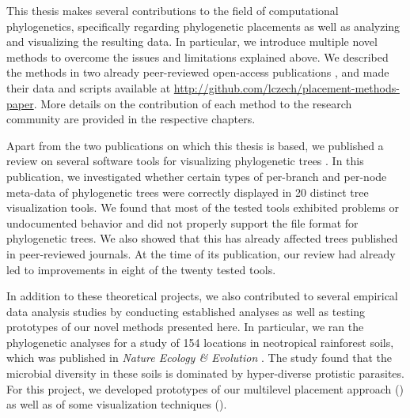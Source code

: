 This thesis makes several contributions to the field of computational phylogenetics,
specifically regarding phylogenetic placements as well as analyzing and visualizing the resulting data.
In particular, we introduce multiple novel methods to overcome the issues and limitations explained above.
We described the methods in two already peer-reviewed open-access publications \cite{Czech2018-phat,Czech2019-analysis},
and made their data and scripts available at \url{http://github.com/lczech/placement-methods-paper}.
More details on the contribution of each method to the research community are provided in the respective chapters.

Apart from the two publications on which this thesis is based,
we published a review on several software tools for visualizing phylogenetic trees \cite{Czech2017-tree-viewers}.
In this publication, we investigated whether certain types of per-branch and per-node meta-data of phylogenetic trees
were correctly displayed in \num{20} distinct tree visualization tools.
We found that most of the tested tools exhibited problems or undocumented behavior and
did not properly support the  file format for phylogenetic trees.
We also showed that this has already affected trees published in peer-reviewed journals.
At the time of its publication, our review had already led to improvements in eight of the twenty tested tools.

In addition to these theoretical projects, we also contributed to several empirical data analysis studies
by conducting established analyses as well as testing prototypes of our novel methods presented here.
In particular, we ran the phylogenetic analyses for a study of \num{154} locations
in neotropical rainforest soils, which was published in \textit{Nature Ecology \& Evolution} \cite{Mahe2017}.
The study found that the microbial diversity in these soils is dominated by hyper-diverse protistic parasites.
For this project, we developed prototypes of our multilevel placement approach
()
as well as of some visualization techniques ().


